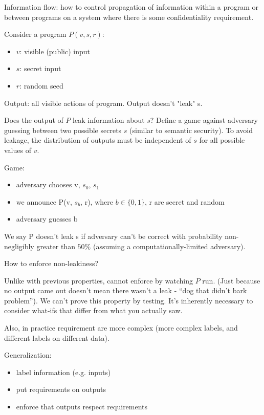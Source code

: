 Information flow: how to control propagation of information within a program or
between programs on a system where there is some confidentiality requirement.

Consider a program $P(v, s, r)$:
\begin{itemize}
    \item $v$: visible (public) input
    \item $s$: secret input
    \item $r$: random seed
\end{itemize}
Output: all visible actions of program. Output doesn't "leak" s. 

Does the output of $P$ leak information about $s$? Define a game against
adversary guessing between two possible secrets $s$ (similar to semantic security). To avoid leakage, the distribution of outputs must be independent of $s$ for all possible values of $v$.

Game:
\begin{itemize}
	\item adversary chooses v, $s_0$, $s_1$
	\item we announce P(v, $s_b$, r), where $b \in \{0,1\}$, r are secret and random
	\item adversary guesses b
\end{itemize}

We say P doesn't leak s if adversary can't be correct with probability non-negligibly greater than $50\%$ (assuming a computationally-limited adversary).

How to enforce non-leakiness?

Unlike with previous properties, cannot enforce by watching $P$ run.
(Just because no output came out doesn't mean there wasn't a leak - ``dog that
didn't bark problem''). We can't prove this property by testing. It's inherently necessary to consider what-ifs that differ from what you actually saw. 

Also, in practice requirement are more complex (more complex labels, and different labels on different data). 

Generalization:
\begin{itemize}
	\item label information (e.g. inputs)
	\item put requirements on outputs
	\item enforce that outputs respect requirements
\end{itemize}


